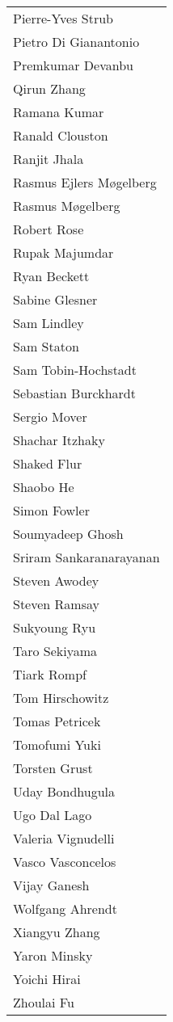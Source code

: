 \begin{tabular}[t]{p{\namewidth}}
   Pierre-Yves Strub
\\ Pietro Di Gianantonio
\\ Premkumar Devanbu
\\ Qirun Zhang
\\ Ramana Kumar
\\ Ranald Clouston
\\ Ranjit Jhala
\\ Rasmus Ejlers Møgelberg
\\ Rasmus Møgelberg
\\ Robert Rose
\\ Rupak Majumdar
\\ Ryan Beckett
\\ Sabine Glesner
\\ Sam Lindley
\\ Sam Staton
\\ Sam Tobin-Hochstadt
\\ Sebastian Burckhardt
\\ Sergio Mover
\\ Shachar Itzhaky
\\ Shaked Flur
\\ Shaobo He
\\ Simon Fowler
\\ Soumyadeep Ghosh
\\ Sriram Sankaranarayanan
\\ Steven Awodey
\\ Steven Ramsay
\\ Sukyoung Ryu
\\ Taro Sekiyama
\\ Tiark Rompf
\\ Tom Hirschowitz
\\ Tomas Petricek
\\ Tomofumi Yuki
\\ Torsten Grust
\\ Uday Bondhugula
\\ Ugo Dal Lago
\\ Valeria Vignudelli
\\ Vasco Vasconcelos
\\ Vijay Ganesh
\\ Wolfgang Ahrendt
\\ Xiangyu Zhang
\\ Yaron Minsky
\\ Yoichi Hirai
\\ Zhoulai Fu
\end{tabular}

